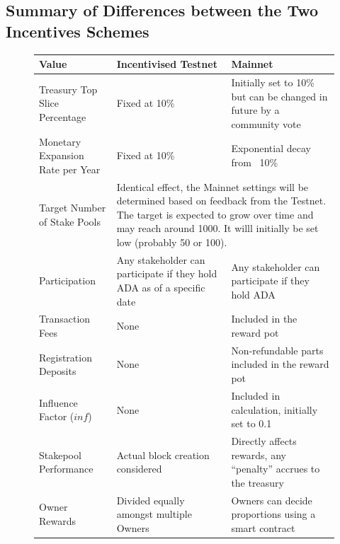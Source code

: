 \documentclass[11pt,a4paper,dvipsnames,twosided,final]{article}
\begin{document}
\clearpage
\subsection{Summary of Differences between the Two Incentives Schemes}
\label{sec:summary}

\begin{figure}[h!]
\begin{center}
\begin{tabular}{||l|p{4cm}|p{4cm}||}
  \hline\hline
  \textbf{Value} & \textbf{Incentivised Testnet} & \textbf{Mainnet}
                                              \\\hline
Treasury Top Slice Percentage
& Fixed at 10\%
& Initially set to 10\% but can be changed in future by a community vote
                                              \\\hline
Monetary Expansion Rate per Year
& Fixed at 10\%
& Exponential decay from ~10\%
                                              \\\hline
 Target Number of Stake Pools
                 &
\multicolumn{2}{|p{8cm}||}{
Identical effect, the Mainnet settings will be determined based on feedback from the Testnet.
The target is expected to grow over time and may reach around 1000.
It willl initially be set low (probably 50 or 100).}
                                              \\\hline
Participation
& Any stakeholder can participate if they hold ADA as of a specific date
& Any stakeholder can participate if they hold ADA
                                              \\\hline
Transaction Fees
& None
& Included in the reward pot
                                              \\\hline
Registration Deposits
& None
& Non-refundable parts included in the reward pot
                                              \\\hline
Influence Factor ($\textit{inf}$)
& None
& Included in calculation, initially set to 0.1
                                              \\\hline
Stakepool Performance
& Actual block creation considered
& Directly affects rewards, any ``penalty'' accrues to the treasury
                                              \\\hline
Owner Rewards
& Divided equally amongst multiple Owners
& Owners can decide proportions using a smart contract
                                              \\\hline

\end{tabular}
\end{center}
\end{figure}
\end{document}
